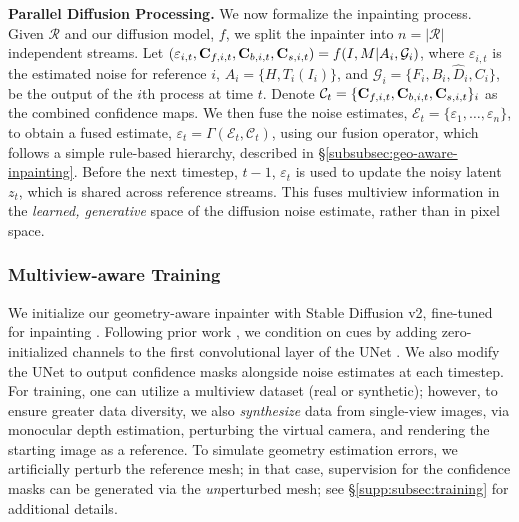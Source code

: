 \noindent\textbf{Parallel Diffusion Processing.}
We now formalize the inpainting process.
Given $\mathcal{R}$ and our diffusion model, $f$, 
we split the inpainter into $n=|\mathcal{R}|$ independent streams.
Let 
$ (\varepsilon_{i,t}, \mathbf{C}_{f,i,t}, \mathbf{C}_{b,i,t}, \mathbf{C}_{s,i,t}) = f(I,M|A_i, \mathcal{G}_i) $, 
where $\varepsilon_{i,t}$ is the estimated noise for reference $i$, $A_i = \{H, T_i(I_i)\}$, and $\mathcal{G}_i = \{ F_i, B_i, \widehat{D}_i, C_i \}$, be the output of the $i$th process at
time $t$.
Denote $\mathcal{C}_t = \{\mathbf{C}_{f,i,t}, \mathbf{C}_{b,i,t}, \mathbf{C}_{s,i,t}\}_{i}$
as the combined confidence
maps.
We then fuse the noise estimates,
$ \mathcal{E}_t = \{ \varepsilon_1, \ldots, \varepsilon_n \}$,
to obtain a
fused
estimate, 
$\varepsilon_t = \Gamma(\mathcal{E}_t, \mathcal{C}_t) $,
using our fusion operator, which follows a simple rule-based hierarchy, described in \S\ref{subsubsec:geo-aware-inpainting}.
Before the next timestep, $t-1$, $\varepsilon_t$ is used to update
the noisy latent $z_t$, which is shared
across reference streams.
This fuses multiview information in the \textit{learned, generative} space of the diffusion noise estimate, rather than in pixel space.



\subsubsection{Multiview-aware Training}
\label{subsec:inptrain}

We initialize our
geometry-aware
inpainter with Stable Diffusion v2, fine-tuned for inpainting \cite{stable.diffusion,sdinp}.
Following prior work \cite{ip2p}, we condition on cues by adding zero-initialized channels to the first convolutional layer of the
UNet \cite{u.net}.
We also modify the UNet to output confidence masks alongside noise estimates at each timestep.
For training, 
one
can utilize a multiview dataset (real or synthetic); however, to ensure greater data diversity, we 
also 
\textit{synthesize} data from single-view images, via monocular depth estimation, perturbing the virtual camera, and rendering the starting image as a reference.
To simulate geometry estimation errors, we artificially perturb the reference mesh; in that case, supervision for the confidence masks can be generated via the \textit{un}perturbed mesh; 
see \S\ref{supp:subsec:training} for additional details.










